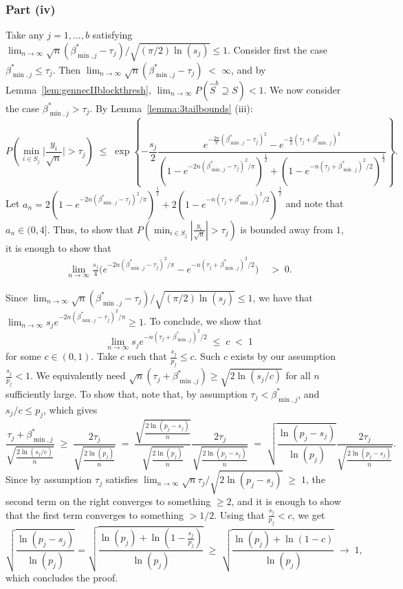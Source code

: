 \documentclass[bj,authoryear]{imsart}
\theoremstyle{plain}
\begin{document}
\subsubsection{Part (iv)}	
Take any $j=1,\ldots,b$ satisfying $\lim_{n\to \infty} \sqrt{n}(\beta_{\min,j}^*-\tau_j)/\sqrt{(\pi/2)\ln(s_j)}\leq 1$. Consider first the case $\beta^*_{\min,j}\leq\tau_j$. Then $ \lim_{n\to \infty} \sqrt{n}(\beta_{\min,j}^*-\tau_j)\; <\; \infty$, and by Lemma~\ref{lem:gennecIIblockthresh}, $\lim_{n \rightarrow \infty} P(\hat S^{b}\supseteq S  ) < 1$. We now consider the case $\beta^*_{\min,j}>\tau_j$. By Lemma~\ref{lemma:3tailbounds} (iii):
$$P\left(\min_{i \in S_j}\Big|\frac{y_i}{\sqrt{n}}\Big| > \tau_j \right)\;\leq\;
\exp\left\{-\frac{s_j}{2}\frac{e^{-\tfrac{2n}{\pi}(\beta^*_{\min,j}-\tau_j)^2}-e^{-\tfrac{n}{2}(\tau_j+\beta^*_{\min,j})^2}}{\left(1-e^{-2n(\beta^*_{\min,j}-\tau_j)^2/\pi}\right)^{\frac{1}{2}}+\left(1-e^{-n(\tau_j+\beta^*_{\min,j})^2/2}\right)^{\frac{1}{2}}}\right\}. $$
Let $a_{n}=2\left(1-e^{-2n(\beta^*_{\min,j}-\tau_j)^2/\pi}\right)^{\frac{1}{2}}+2\left(1-e^{-n(\tau_j+\beta^*_{\min,j})^2/2}\right)^{\frac{1}{2}}$ and note that $a_n\in (0, 4]$.  Thus, to show that $P\left(\min_{i \in S_j}|\tfrac{y_i}{\sqrt{n}}| > \tau_j \right)$ is bounded away from $1$, it is enough to show that 
\begin{align*}
\lim_{n\to \infty} \frac{s_j}{4}\big({e^{-2n(\beta^*_{\min,j}-\tau_j)^2/\pi}-e^{-n(\tau_j+\beta^*_{\min,j})^2/2}}\big)
&\;>\;0.
\end{align*}

Since $\lim_{n\to \infty} \sqrt{n}(\beta_{\min,j}^*-\tau_j)/\sqrt{(\pi/2)\ln(s_j)}\leq 1$, we have that $\lim_{n\to\infty} {s_j} e^{-2n(\beta^*_{\min,j}-\tau_j)^2/\pi}\geq 1$. To conclude, we show that
$$
\lim_{n\to\infty} {s_j} e^{-n(\tau_j+\beta^*_{\min,j})^2/2}\;\leq\;c\;<\;1
$$ 
for some $c\in(0,1)$. Take $c$ such that $\tfrac{s_j}{p_j}\leq c$. Such $c$ exists by our assumption $\tfrac{s_j}{p_j}<1$.
We equivalently need
$\sqrt{n}(\tau_j+\beta^*_{\min,j})\geq\sqrt{{2\ln (s_j/c)}}$ for all $n$ sufficiently large. To show that, note that, by assumption $\tau_j< \beta^*_{\min,j}$, and $s_j/c\leq p_j$, which gives
$$
\frac{\tau_j+\beta^*_{\min,j}}{\sqrt{\tfrac{2\ln(s_j/c)}{n}}}\;\geq\;\frac{2\tau_j}{\sqrt{\tfrac{2\ln(p_j)}{n}}}\;=\;\frac{\sqrt{\tfrac{2\ln(p_j-s_j)}{n}}}{\sqrt{\tfrac{2\ln(p_j)}{n}}}\frac{2\tau_j}{\sqrt{\tfrac{2\ln(p_j-s_j)}{n}}}\;=\;\sqrt{\frac{\ln(p_j-s_j)}{\ln(p_j)}}\frac{2\tau_j}{\sqrt{\tfrac{2\ln(p_j-s_j)}{n}}}.
$$
Since by assumption $\tau_j$ satisfies $\lim_{n\to \infty} \sqrt{n}\tau_j/\sqrt{2\ln(p_j-s_j)}\;\geq\;1$, the second term on the right converges to something $\geq 2$, and it is enough to show that the first term converges to something $>1/2$. Using that $\tfrac{s_j}{p_j}<c$, we get
$$
\sqrt{\frac{\ln(p_j-s_j)}{\ln(p_j)}}
= \sqrt{\frac{\ln(p_j) + \ln(1-\frac{s_j}{p_j})}{\ln(p_j)}}
\;\geq\;\sqrt{\frac{\ln(p_j)+\ln(1-c)}{\ln(p_j)}}\;\to\;1,
$$
which concludes the proof.
\end{document}
